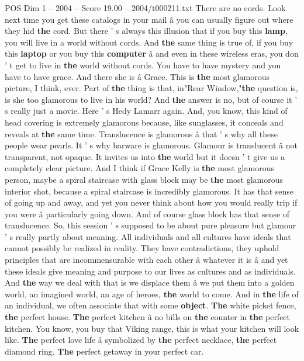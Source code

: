 \begin{textsample}{POS Dim 1 – 2004 – Score 19.00 – 2004/t000211.txt}
There are no cords.
Look next time you get these catalogs in your mail â you can usually figure out where they hid \textbf{the} cord.
But there ' s always this illusion that if you buy this \textbf{lamp}, you will live in a world without cords.
And \textbf{the} same thing is true of, if you buy this \textbf{laptop} or you buy this \textbf{computer} â and even in these wireless eras, you don ' t get to live in \textbf{the} world without cords.
You have to have mystery and you have to have grace.
And there she is â Grace.
This is \textbf{the} most glamorous picture, I think, ever.
Part of \textbf{the} thing is that, in"Rear Window,"\textbf{the} question is, is she too glamorous to live in his world?
And \textbf{the} answer is no, but of course it ' s really just a movie.
Here ' s Hedy Lamarr again.
And, you know, this kind of head covering is extremely glamorous because, like sunglasses, it conceals and reveals at \textbf{the} same time.
Translucence is glamorous â that ' s why all these people wear pearls.
It ' s why barware is glamorous.
Glamour is translucent â not transparent, not opaque.
It invites us into \textbf{the} world but it doesn ' t give us a completely clear picture.
And I think if Grace Kelly is \textbf{the} most glamorous person, maybe a spiral staircase with glass block may be \textbf{the} most glamorous interior shot, because a spiral staircase is incredibly glamorous.
It has that sense of going up and away, and yet you never think about how you would really trip if you were â particularly going down.
And of course glass block has that sense of translucence.
So, this session ' s supposed to be about pure pleasure but glamour ' s really partly about meaning.
All individuals and all cultures have ideals that cannot possibly be realized in reality.
They have contradictions, they uphold principles that are incommensurable with each other â whatever it is â and yet these ideals give meaning and purpose to our lives as cultures and as individuals.
And \textbf{the} way we deal with that is we displace them â we put them into a golden world, an imagined world, an age of heroes, \textbf{the} world to come.
And in \textbf{the} life of an individual, we often associate that with some \textbf{object}. \textbf{The} white picket fence, \textbf{the} perfect house. \textbf{The} perfect kitchen â no bills on \textbf{the} counter in \textbf{the} perfect kitchen.
You know, you buy that Viking range, this is what your kitchen will look like. \textbf{The} perfect love life â symbolized by \textbf{the} perfect necklace, \textbf{the} perfect diamond ring. \textbf{The} perfect getaway in your perfect car.

\end{textsample}
